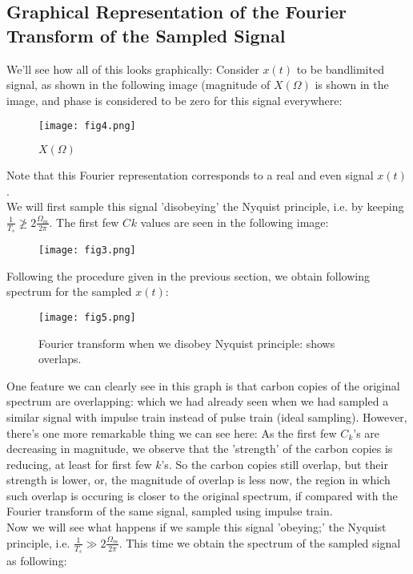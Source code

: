 \subsection{Graphical Representation of the Fourier Transform of the Sampled Signal}
We'll see how all of this looks graphically: Consider $x(t)$ to be bandlimited signal, as shown in the following image (magnitude of $X(\Omega)$ is shown in the image, and phase is considered to be zero for this signal everywhere:\\

\begin{figure}[htb]
\centering
\texttt{[image: fig4.png]}
\caption{$X(\Omega)$}
\end{figure}

Note that this Fourier representation corresponds to a real and even signal $x(t)$.\\
We will first sample this signal 'disobeying' the Nyquist principle, i.e. by keeping $\frac{1}{T_{s}}\ngeq2\frac{\Omega_m}{2\pi}$. The first few $C_{}k$ values are seen in the following image:\\

\begin{figure}[htb]
\centering
\texttt{[image: fig3.png]}
\end{figure}

Following the procedure given in the previous section, we obtain following spectrum for the sampled $x(t)$:\\

\begin{figure}[htb]
\centering
\texttt{[image: fig5.png]}
\caption{Fourier transform when we disobey Nyquist principle: shows overlaps.}
\end{figure}

One feature we can clearly see in this graph is that carbon copies of the original spectrum are overlapping: which we had already seen when we had sampled a similar signal with impulse train instead of pulse train (ideal sampling). However, there's one more remarkable thing we can see here: As the first few $C_k$'s are decreasing in magnitude, we observe that the 'strength' of the carbon copies is reducing, at least for first few $k$'s. So the carbon copies still overlap, but their strength is lower, or, the magnitude of overlap is less now, the region in which such overlap is occuring is closer to the original spectrum, if compared with the Fourier transform of the same signal, sampled using impulse train.\\
Now we will see what happens if we sample this signal 'obeying;' the Nyquist principle, i.e. $\frac{1}{T_{s}}\gg2\frac{\Omega_m}{2\pi}$. This time we obtain the spectrum of the sampled signal as following:\\

